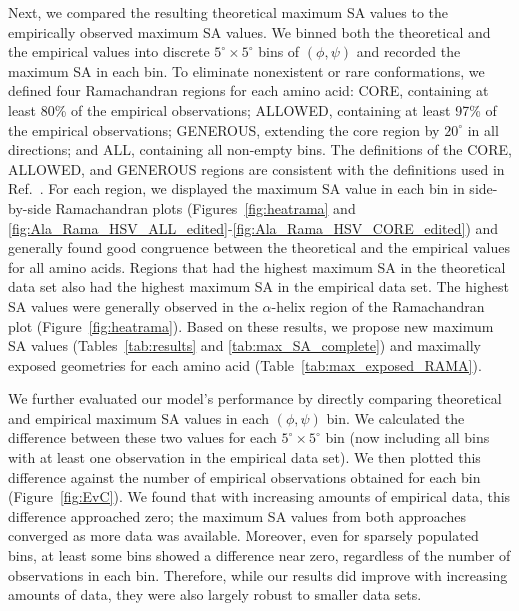 \documentclass[11pt]{article}
\begin{document}
Next, we compared the resulting theoretical maximum SA values to the empirically observed maximum SA values. We binned both the theoretical and the empirical values into discrete $5^\circ\times5^\circ$ bins of $(\phi, \psi)$ and recorded the maximum SA in each bin. To eliminate nonexistent or rare conformations, we defined four Ramachandran regions for each amino acid: CORE, containing at least 80\% of the empirical observations; ALLOWED, containing at least 97\% of the empirical observations; GENEROUS, extending the core region by $20^\circ$ in all directions; and ALL, containing all non-empty bins. The definitions of the CORE, ALLOWED, and GENEROUS regions are consistent with the definitions used in Ref.~\cite{Morrisetal1992}. For each region, we displayed the maximum SA value in each bin in side-by-side Ramachandran plots (Figures~\ref{fig:heatrama} and \ref{fig:Ala_Rama_HSV_ALL_edited}-\ref{fig:Ala_Rama_HSV_CORE_edited}) and generally found good congruence between the theoretical and the empirical values for all amino acids. Regions that had the highest maximum SA in the theoretical data set also had the highest maximum SA in the empirical data set. The highest SA values were generally observed in the $\alpha$-helix region of the Ramachandran plot (Figure~\ref{fig:heatrama}). Based on these results, we propose new maximum SA values (Tables~\ref{tab:results} and \ref{tab:max_SA_complete}) and maximally exposed geometries for each amino acid (Table~\ref{tab:max_exposed_RAMA}).

We further evaluated our model's performance by directly comparing theoretical and empirical maximum SA values in each $(\phi, \psi)$ bin. We calculated the difference between these two values for each $5^\circ\times5^\circ$ bin (now including all bins with at least one observation in the empirical data set). We then plotted this difference against the number of empirical observations obtained for each bin (Figure~\ref{fig:EvC}). We found that with increasing amounts of empirical data, this difference approached zero; the maximum SA values from both approaches converged as more data was available. Moreover, even for sparsely populated bins, at least some bins showed a difference near zero, regardless of the number of observations in each bin. Therefore, while our results did improve with increasing amounts of data, they were also largely robust to smaller data sets.
\end{document}
